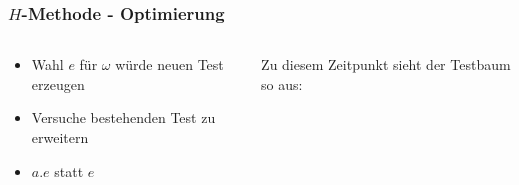 \begin{frame}
  \frametitle{$H$-Methode - Optimierung}
  \begin{columns}[T] %

\begin{column}{.4\textwidth}
  \begin{itemize}
	\item<2->Wahl $e$ für $\omega$ würde neuen Test erzeugen
	\item<3->Versuche bestehenden Test zu erweitern
	\item<4->$a.e$ statt $e$
  \end{itemize}
\end{column}%

\begin{column}{.70\textwidth}
Zu diesem Zeitpunkt sieht der Testbaum so aus:

\end{column}
\end{columns}
\end{frame}
